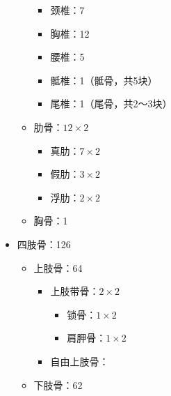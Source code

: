 \begin{notation}
\begin{itemize}
\begin{itemize}
\begin{itemize}
                        \item 颈椎：7
                        \item 胸椎：12
                        \item 腰椎：5
                        \item 骶椎：1（骶骨，共5块）
                        \item 尾椎：1（尾骨，共2～3块）
                    \end{itemize}
                \item 肋骨：$12\times 2$
                    \begin{itemize}
                        \item 真肋：$7\times 2$
                        \item 假肋：$3\times 2$
                        \item 浮肋：$2\times 2$
                    \end{itemize}
                \item 胸骨：1
            \end{itemize}
        \item 四肢骨：126
            \begin{itemize}
                \item 上肢骨：64
                    \begin{itemize}
                        \item 上肢带骨：$2\times 2$
                            \begin{itemize}
                                \item 锁骨：$1\times 2$
                                \item 肩胛骨：$1\times 2$
                            \end{itemize}
                        \item 自由上肢骨：
                    \end{itemize}
                \item 下肢骨：62
            \end{itemize}
    \end{itemize}
\end{notation}

